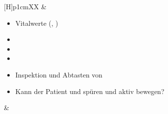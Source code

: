 {\begin{minipage}[t]{\linewidth -
{2\fboxrule} - {2\fboxsep}}
\begin{minipage}[t]{\linewidth}
{\begin{tabularx}{\linewidth}[H]{p{1cm}XX}
&
\begin{minipage}[t]{\linewidth}
\begin{itemize}
  \item Vitalwerte (, )
  \item {}
  \item {}
  \item {}
  \item[*] Inspektion
  und Abtasten von
  \item[*] Kann der
  Patient  und  spüren und aktiv bewegen?
\end{itemize}
\end{minipage}
&
\\\addlinespace\midrule\addlinespace
\noindent{}


\end{tabularx}}
\end{minipage}
\end{minipage}}
